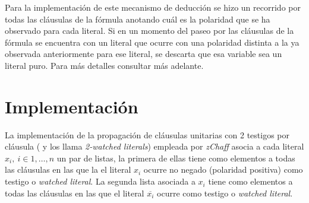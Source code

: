 \documentclass[12pt,lettersize,oneside]{article}
\begin{document}
Para la implementación de este mecanismo de deducción se hizo un recorrido por
todas las cláusulas de la fórmula anotando cuál es la polaridad que se ha
observado para cada literal. Si en un momento del paseo por las cláusulas de la
fórmula se encuentra con un literal que ocurre con una polaridad distinta a la
ya observada anteriormente para ese literal, se descarta que esa variable sea un
literal puro. Para más detalles consultar más adelante.

\section{Implementación}


La implementación de la propagación de cláusulas unitarias con 2 testigos por
cláusula (\cite{Zhang} y \cite{ZhangThesis} los llama \emph{2-watched literals})
empleada por \emph{zChaff} asocia a cada literal $x_i,\ i\in{1,\ldots,n}$ un par
de listas, la primera de ellas tiene como elementos a todas las cláusulas en las
que la el literal $x_i$ ocurre no negado (polaridad positiva) como testigo o
\emph{watched literal}. La segunda lista asociada a $x_i$ tiene como elementos a
todas las cláusulas en las que el literal $\overline{x_i}$ ocurre como testigo o
\emph{watched literal}.
\end{document}
